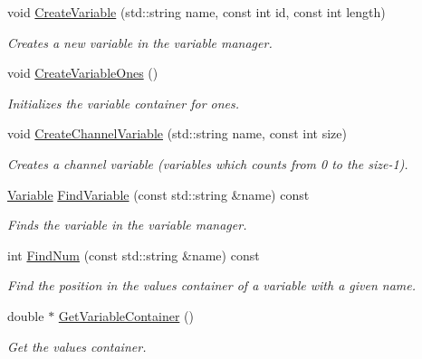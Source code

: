 \begin{DoxyCompactItemize}
\item 
void \mbox{\hyperlink{classQn_1_1VariableManager_a16091c43e9057525c4aee479f41fec43}{Create\+Variable}} (std\+::string name, const int id, const int length)
\begin{DoxyCompactList}\small\item\em Creates a new variable in the variable manager. \end{DoxyCompactList}\item 
\mbox{\label{classQn_1_1VariableManager_a251e6b1f5cbc8946c2d9a48fe1b2dd72}} 
void \mbox{\hyperlink{classQn_1_1VariableManager_a251e6b1f5cbc8946c2d9a48fe1b2dd72}{Create\+Variable\+Ones}} ()
\begin{DoxyCompactList}\small\item\em Initializes the variable container for ones. \end{DoxyCompactList}\item 
void \mbox{\hyperlink{classQn_1_1VariableManager_a61883778476184c84fa02a6f3b55cea0}{Create\+Channel\+Variable}} (std\+::string name, const int size)
\begin{DoxyCompactList}\small\item\em Creates a channel variable (variables which counts from 0 to the size-\/1). \end{DoxyCompactList}\item 
\mbox{\hyperlink{classQn_1_1Variable}{Variable}} \mbox{\hyperlink{classQn_1_1VariableManager_a7fa013595b7bad28ff827565095b0e53}{Find\+Variable}} (const std\+::string \&name) const
\begin{DoxyCompactList}\small\item\em Finds the variable in the variable manager. \end{DoxyCompactList}\item 
int \mbox{\hyperlink{classQn_1_1VariableManager_a96354f765ae5a827aa9218cc8b2b0270}{Find\+Num}} (const std\+::string \&name) const
\begin{DoxyCompactList}\small\item\em Find the position in the values container of a variable with a given name. \end{DoxyCompactList}\item 
double $\ast$ \mbox{\hyperlink{classQn_1_1VariableManager_a92e8ecd78b48bf6a719f3cacb11d1d8c}{Get\+Variable\+Container}} ()
\begin{DoxyCompactList}\small\item\em Get the values container. \end{DoxyCompactList}\item 

\end{DoxyCompactItemize}
